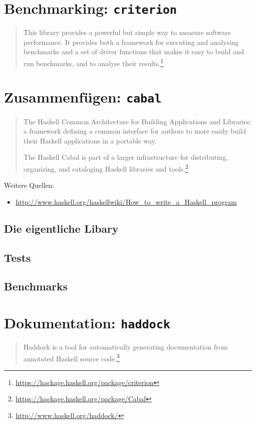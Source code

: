 \section{Benchmarking: \texttt{criterion}}
\begin{quote}
  This library provides a powerful but simple way to measure software
  performance. It provides both a framework for executing and analysing
  benchmarks and a set of driver functions that makes it easy to build and run
  benchmarks, and to analyse their
  results.\footnote{\url{https://hackage.haskell.org/package/criterion}}
\end{quote}

\section{Zusammenfügen: \texttt{cabal}}
\begin{quote}
  The Haskell Common Architecture for Building Applications and Libraries: a
  framework defining a common interface for authors to more easily build their
  Haskell applications in a portable way.

  The Haskell Cabal is part of a larger infrastructure for distributing,
  organizing, and cataloging Haskell libraries and
  tools.\footnote{\url{https://hackage.haskell.org/package/Cabal}}
\end{quote}
Weitere Quellen:
\begin{itemize}
  \item \url{http://www.haskell.org/haskellwiki/How_to_write_a_Haskell_program}
\end{itemize}

%

\subsection{Die eigentliche Libary}
%

\subsection{Tests}
%

\subsection{Benchmarks}
%

\section{Dokumentation: \texttt{haddock}}
\begin{quote}
  Haddock is a tool for automatically generating documentation from annotated
  Haskell source code.\footnote{\url{http://www.haskell.org/haddock/}}
\end{quote}
